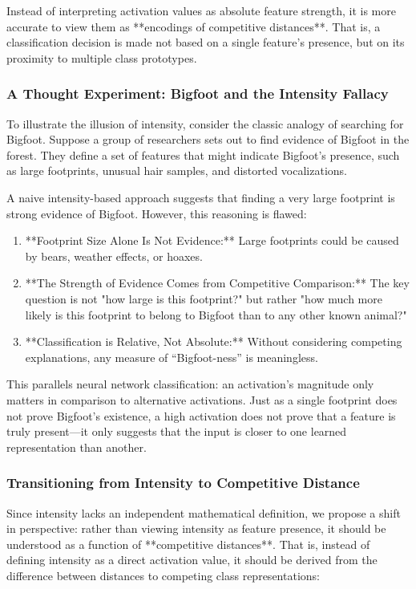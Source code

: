 Instead of interpreting activation values as absolute feature strength, it is more accurate to view them as **encodings of competitive distances**. That is, a classification decision is made not based on a single feature’s presence, but on its proximity to multiple class prototypes.

\subsubsection{A Thought Experiment: Bigfoot and the Intensity Fallacy}

To illustrate the illusion of intensity, consider the classic analogy of searching for Bigfoot. Suppose a group of researchers sets out to find evidence of Bigfoot in the forest. They define a set of features that might indicate Bigfoot’s presence, such as large footprints, unusual hair samples, and distorted vocalizations.

A naive intensity-based approach suggests that finding a very large footprint is strong evidence of Bigfoot. However, this reasoning is flawed:

\begin{enumerate}
    \item **Footprint Size Alone Is Not Evidence:** Large footprints could be caused by bears, weather effects, or hoaxes.
    \item **The Strength of Evidence Comes from Competitive Comparison:** The key question is not "how large is this footprint?" but rather "how much more likely is this footprint to belong to Bigfoot than to any other known animal?"
    \item **Classification is Relative, Not Absolute:** Without considering competing explanations, any measure of “Bigfoot-ness” is meaningless.
\end{enumerate}

This parallels neural network classification: an activation’s magnitude only matters in comparison to alternative activations. Just as a single footprint does not prove Bigfoot’s existence, a high activation does not prove that a feature is truly present—it only suggests that the input is closer to one learned representation than another.

\subsubsection{Transitioning from Intensity to Competitive Distance}

Since intensity lacks an independent mathematical definition, we propose a shift in perspective: rather than viewing intensity as feature presence, it should be understood as a function of **competitive distances**. That is, instead of defining intensity as a direct activation value, it should be derived from the difference between distances to competing class representations:

